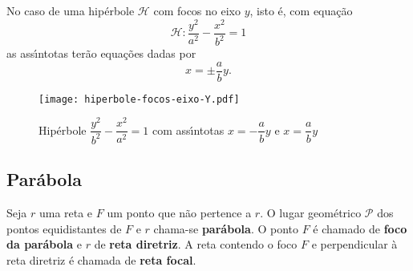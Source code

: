\begin{observacao}
  No caso de uma hip\'erbole $\mathcal{H}$ com focos no eixo $y$, isto \'e, com equa\c{c}\~ao
  \[
    \mathcal{H}: \dfrac{y^2}{a^2} - \dfrac{x^2}{b^2} = 1
  \]
  as ass{\'\i}ntotas ter\~ao equa\c{c}\~oes dadas por
  \[
    x = \pm \dfrac{a}{b}y.
  \]
\end{observacao}

\begin{figure}[h]
  \centering
  \caption{Hip\'erbole $\dfrac{y^2}{b^2} - \dfrac{x^2}{a^2} = 1$ com ass{\'\i}ntotas $x = -\dfrac{a}{b}y$ e $x = \dfrac{a}{b}y$}
  \texttt{[image: hiperbole-focos-eixo-Y.pdf]}
\end{figure}




\subsection{Par\'abola} %
\label{sub:parabolas}

\begin{definicao}
  Seja $r$ uma reta e $F$ um ponto que n\~ao pertence a $r$. O lugar geom\'etrico $\mathcal{P}$ dos pontos equidistantes de $F$ e $r$ chama-se \textbf{par\'abola}. O ponto $F$ \'e chamado de \textbf{foco da par\'abola} e $r$ de \textbf{reta diretriz}.  A reta contendo o foco $F$ e perpendicular \`a reta diretriz \'e chamada de \textbf{reta focal}.
\end{definicao}


